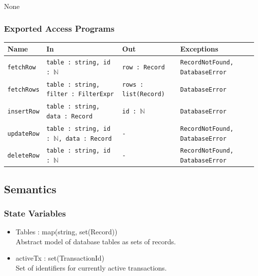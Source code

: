 \documentclass[12pt, titlepage]{article}
\begin{document}
None

\subsubsection{Exported Access Programs}

\begin{center}
\begin{tabularx}{\textwidth}{p{} p{} p{} p{}}
\hline
\textbf{Name} & \textbf{In} & \textbf{Out} & \textbf{Exceptions} \\
\hline
\texttt{fetchRow} &
\texttt{table : string, id : $\mathbb{N}$} &
\texttt{row : Record} &
\texttt{RecordNotFound, DatabaseError} \\
\hline
\texttt{fetchRows} &
\texttt{table : string, filter : FilterExpr} &
\texttt{rows : list(Record)} &
\texttt{DatabaseError} \\
\hline
\texttt{insertRow} &
\texttt{table : string, data : Record} &
\texttt{id : $\mathbb{N}$} &
\texttt{DatabaseError} \\
\hline
\texttt{updateRow} &
\texttt{table : string, id : $\mathbb{N}$, data : Record} &
\texttt{-} &
\texttt{RecordNotFound, DatabaseError} \\
\hline
\texttt{deleteRow} &
\texttt{table : string, id : $\mathbb{N}$} &
\texttt{-} &
\texttt{RecordNotFound, DatabaseError} \\
\hline

\end{tabularx}
\end{center}


\subsection{Semantics}

\subsubsection{State Variables}

\begin{itemize}
  \item Tables : map(string, set(Record)) \\
        Abstract model of database tables as sets of records.
  \item activeTx : set(TransactionId) \\
        Set of identifiers for currently active transactions.
\end{itemize}
\end{document}

